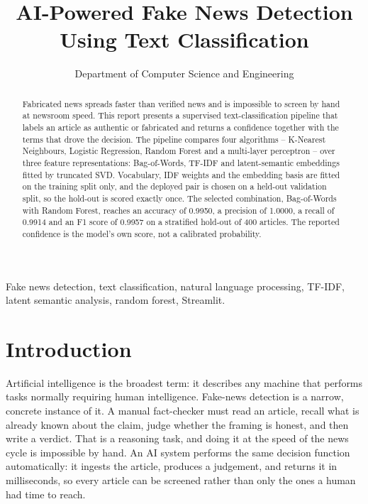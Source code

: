 \documentclass[conference,a4paper]{IEEEtran}
\title{AI-Powered Fake News Detection Using Text Classification}
\author{Department of Computer Science and Engineering}
\begin{document}
\maketitle

\begin{abstract}
Fabricated news spreads faster than verified news and is impossible to screen by hand at newsroom speed. This report presents a supervised text-classification pipeline that labels an article as authentic or fabricated and returns a confidence together with the terms that drove the decision. The pipeline compares four algorithms -- K-Nearest Neighbours, Logistic Regression, Random Forest and a multi-layer perceptron -- over three feature representations: Bag-of-Words, TF-IDF and latent-semantic embeddings fitted by truncated SVD. Vocabulary, IDF weights and the embedding basis are fitted on the training split only, and the deployed pair is chosen on a held-out validation split, so the hold-out is scored exactly once. The selected combination, Bag-of-Words with Random Forest, reaches an accuracy of 0.9950, a precision of 1.0000, a recall of 0.9914 and an F1 score of 0.9957 on a stratified hold-out of 400 articles. The reported confidence is the model's own score, not a calibrated probability.

\end{abstract}

\begin{IEEEkeywords}
Fake news detection, text classification, natural language processing, TF-IDF, latent semantic analysis, random forest, Streamlit.
\end{IEEEkeywords}

\section{Introduction}

Artificial intelligence is the broadest term: it describes any machine that performs tasks normally requiring human intelligence. Fake-news detection is a narrow, concrete instance of it. A manual fact-checker must read an article, recall what is already known about the claim, judge whether the framing is honest, and then write a verdict. That is a reasoning task, and doing it at the speed of the news cycle is impossible by hand. An AI system performs the same decision function automatically: it ingests the article, produces a judgement, and returns it in milliseconds, so every article can be screened rather than only the ones a human had time to reach.
\end{document}
